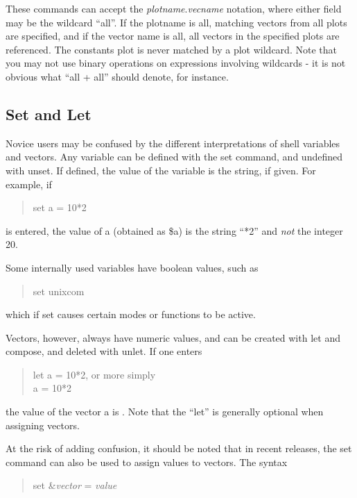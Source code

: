 These commands can accept the {\it plotname\/}.{\it vecname}
notation, where either field may be the wildcard ``{\vt all}''.  If
the plotname is {\vt all}, matching vectors from all plots are
specified, and if the vector name is {\vt all}, all vectors in the
specified plots are referenced.  The {\vt constants} plot is never
matched by a plot wildcard.  Note that you may not use binary
operations on expressions involving wildcards - it is not obvious what
``{\vt all + all}'' should denote, for instance.

\subsection{Set and Let}


Novice {\WRspice} users may be confused by the different
interpretations of shell variables and vectors.  Any variable can be
defined with the {\cb set} command, and undefined with {\cb unset}. 
If defined, the value of the variable is the string, if given.  For
example, if
\begin{quote}\vt
set a = 10*2
\end{quote}
is entered, the value of {\vt a} (obtained as {\vt \$a}) is the string
``{*2}'' and {\it not} the integer 20.

Some internally used variables have boolean values, such as 
\begin{quote}\vt
set unixcom
\end{quote}
which if set causes certain modes or functions to be active.

Vectors, however, always have numeric values, and can be created with
{\cb let} and {\cb compose}, and deleted with {\cb unlet}.  If one
enters
\begin{quote}\vt
let a = 10*2, {\rm or more simply}\\
a = 10*2
\end{quote}
the value of the vector {\vt a} is {}.  Note that the ``{\vt let}''
is generally optional when assigning vectors.

At the risk of adding confusion, it should be noted that in recent
{\WRspice} releases, the {\cb set} command can also be used to assign
values to vectors.  The syntax

\begin{quote}
{\vt set \&}{\it vector} {\vt =} {\it value}
\end{quote}
 
